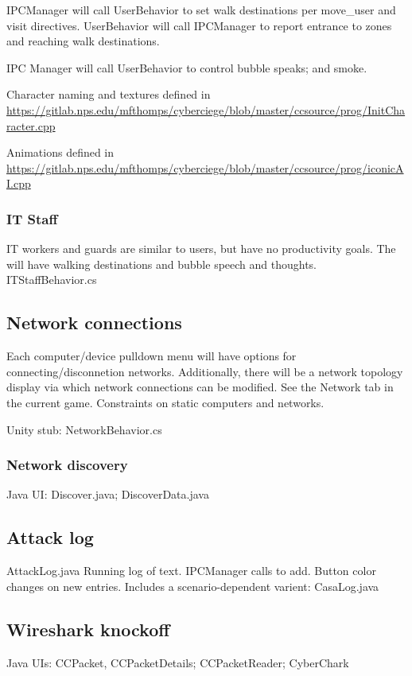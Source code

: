 \documentclass{article}
\begin{document}
IPCManager will call UserBehavior to set walk destinations per move\_user and visit directives.
UserBehavior will call IPCManager to report entrance to zones and reaching
walk destinations.

IPC Manager will call UserBehavior to control bubble speaks; and smoke.

Character naming and textures defined in \newline
\url{https://gitlab.nps.edu/mfthomps/cyberciege/blob/master/ccsource/prog/InitCharacter.cpp}

Animations defined in \newline
\url{https://gitlab.nps.edu/mfthomps/cyberciege/blob/master/ccsource/prog/iconicAI.cpp}

\subsubsection{IT Staff}
IT workers and guards are similar to users, but have no productivity goals. The will have walking 
destinations and bubble speech and thoughts.
ITStaffBehavior.cs

\subsection{Network connections}
Each computer/device pulldown menu will have options for connecting/disconnetion networks.
Additionally, there will be a network topology display via which network connections can
be modified.  See the Network tab in the current game.
Constraints on static computers and networks.

Unity stub: NetworkBehavior.cs

\subsubsection{Network discovery}
Java UI:  Discover.java; DiscoverData.java

\subsection{Attack log}
AttackLog.java
Running log of text. IPCManager calls to add.  Button color changes on new entries.
Includes a scenario-dependent varient: CasaLog.java

\subsection{Wireshark knockoff}
Java UIs:
CCPacket, CCPacketDetails; CCPacketReader; CyberChark
\end{document}
